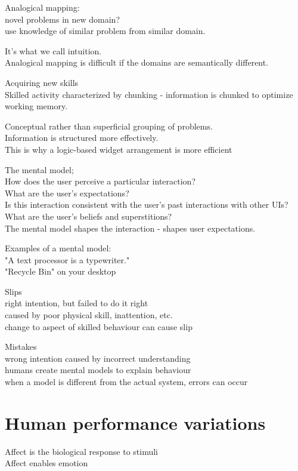 \documentclass[]{project_plan}
\begin{document}
Analogical mapping:\\
novel problems in new domain?\\
use knowledge of similar problem from similar domain.

It’s what we call intuition.\\
Analogical mapping is difficult if the domains are semantically different.

Acquiring new skills\\
Skilled activity characterized by chunking - information is chunked to
optimize working memory.

Conceptual rather than superficial grouping of problems.\\
Information is structured more effectively.\\
This is why a logic-based widget arrangement is more efficient

The mental model;\\
How does the user perceive a particular interaction?\\
What are the user's expectations?\\
Is this interaction consistent with the user's past interactions with other UIs?\\
What are the user's beliefs and superstitions?\\
The mental model shapes the interaction - shapes user expectations.

Examples of a mental model:\\
"A text processor is a typewriter."\\
"Recycle Bin" on your desktop

Slips\\
right intention, but failed to do it right\\
caused by poor physical skill, inattention, etc.\\
change to aspect of skilled behaviour can cause slip

Mistakes\\
wrong intention caused by incorrect understanding\\
humans create mental models to explain behaviour\\
when a model is different from the actual system, errors can occur

\section{Human performance variations}

Affect is the biological response to stimuli\\
Affect enables emotion
\end{document}

